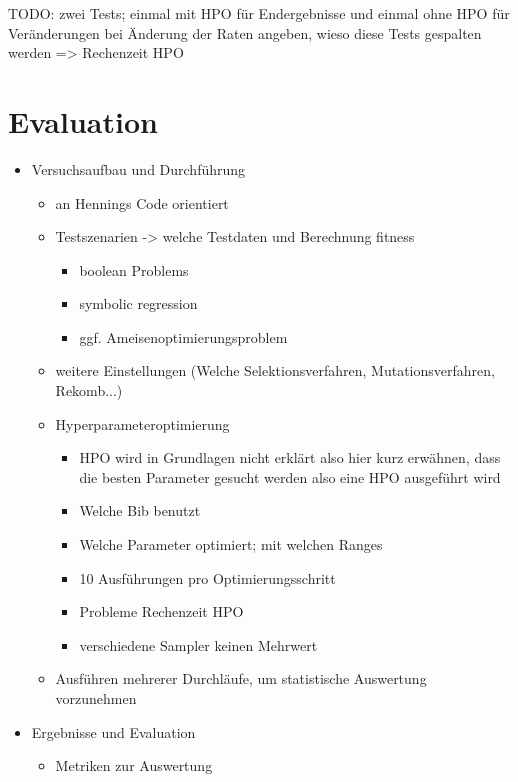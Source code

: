 TODO: zwei Tests; einmal mit HPO für Endergebnisse und einmal ohne HPO für Veränderungen bei Änderung der Raten
angeben, wieso diese Tests gespalten werden => Rechenzeit HPO


\section{Evaluation}
\label{sec:Evaluation}

\begin{itemize}
    \item Versuchsaufbau und Durchführung
    \begin{itemize}
        \item an Hennings Code orientiert
        \item Testszenarien -> welche Testdaten und Berechnung fitness
        \begin{itemize}
            \item boolean Problems
            \item symbolic regression
            \item ggf. Ameisenoptimierungsproblem
        \end{itemize}
        \item weitere Einstellungen (Welche Selektionsverfahren, Mutationsverfahren, Rekomb...)
        \item Hyperparameteroptimierung
        \begin{itemize}
        	\item HPO wird in Grundlagen nicht erklärt also hier kurz erwähnen, dass die besten Parameter gesucht werden also eine HPO ausgeführt wird
            \item Welche Bib benutzt
            \item Welche Parameter optimiert; mit welchen Ranges
            \item 10 Ausführungen pro Optimierungsschritt
            \item Probleme Rechenzeit HPO
            \item verschiedene Sampler keinen Mehrwert
        \end{itemize}
        \item Ausführen mehrerer Durchläufe, um statistische Auswertung vorzunehmen
    \end{itemize}
    \item Ergebnisse und Evaluation
    \begin{itemize}
        \item Metriken zur Auswertung

\end{itemize}
\end{itemize}
